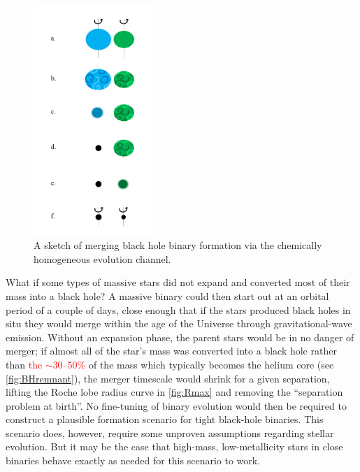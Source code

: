 \documentclass[iop,onecolumn]{revtex4}
\newcommand{\ajf}[1]{\textcolor{red}{#1}}
\begin{document}
\begin{figure}
	\centering
	\includegraphics[width=0.4\textwidth]{channel2.png}
	\caption{\label{fig:chem_homog} A sketch of merging black hole binary formation via the chemically homogeneous evolution channel.}
\end{figure}

What if some types of massive stars did not expand and converted most of their mass into a black hole? A massive binary could then start out at an orbital period of a couple of days, close enough that if the stars produced black holes in situ they would merge within the age of the Universe through gravitational-wave emission. Without an expansion phase, the parent stars would be in no danger of merger; if almost all of the star's mass was converted into a black hole rather than \ajf{the $\sim$30--50\%} of the mass which typically becomes the helium core (see \autoref{fig:BHremnant}), the merger timescale would shrink for a given separation, lifting the Roche lobe radius curve in \autoref{fig:Rmax} and removing the ``separation problem at birth''.  No fine-tuning of binary evolution would then be required to construct a plausible formation scenario for tight black-hole binaries.  This scenario does, however, require some unproven assumptions regarding stellar evolution. But it may be the case that high-mass, low-metallicity stars in close binaries behave exactly as needed for this scenario to work.
\end{document}
